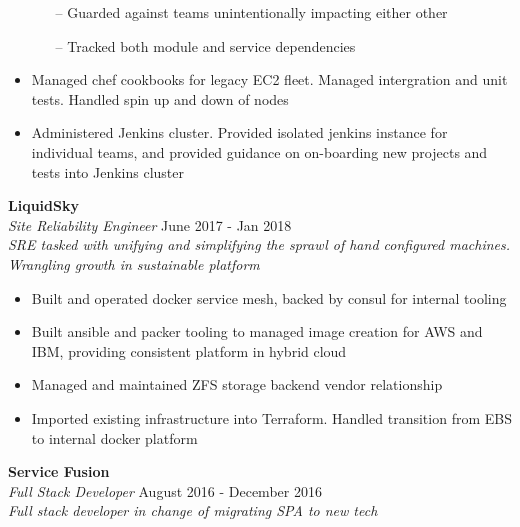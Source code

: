 \begin{minipage}[t]{\linewidth}
\begin{itemize}
\begin{itemize}
        \item[--] Guarded against teams unintentionally impacting either other
        \item[--] Tracked both module and service dependencies
      \end{itemize}
    \item Managed chef cookbooks for legacy EC2 fleet. Managed intergration and unit tests. Handled spin up and down of nodes
    \item Administered Jenkins cluster. Provided isolated jenkins instance for individual teams, and provided guidance on on-boarding new projects and tests into Jenkins cluster
  \end{itemize}
\end{minipage}


\large{\textbf{LiquidSky}} \\
\textit{Site Reliability Engineer} \hfill June 2017 - Jan 2018 \\[3.75pt]
\textit{SRE tasked with unifying and simplifying the sprawl of hand configured machines. Wrangling growth in sustainable platform}

\begin{minipage}[t]{\linewidth}
  \begin{itemize}
    \item Built and operated docker service mesh, backed by consul for internal tooling
    \item Built ansible and packer tooling to managed image creation for AWS and IBM, providing consistent platform in hybrid cloud
    \item Managed and maintained ZFS storage backend vendor relationship
    \item Imported existing infrastructure into Terraform. Handled transition from EBS to internal docker platform
  \end{itemize}
\end{minipage}

\large{\textbf{Service Fusion}} \\
\textit{Full Stack Developer} \hfill August 2016 - December 2016 \\[3.75pt]
\textit{Full stack developer in change of migrating SPA to new tech}


